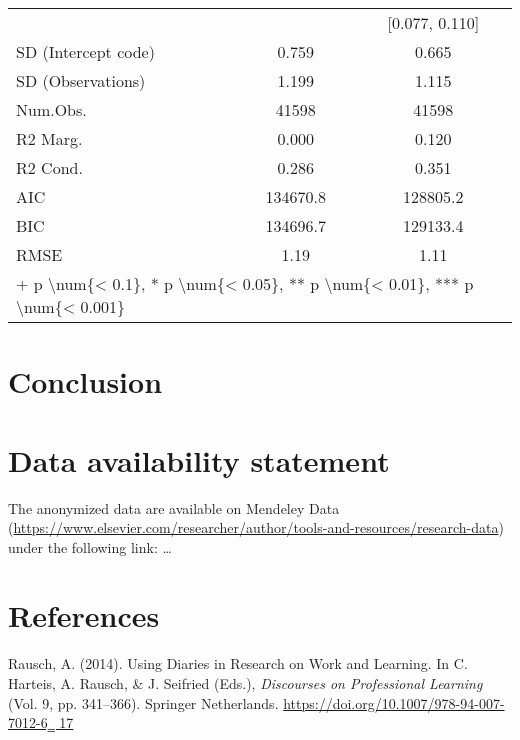 \documentclass[
]{article}
\newlength{\cslhangindent}
\newenvironment{CSLReferences}[2] %
 {\begin{list}{}{%
  \setlength{\itemindent}{0pt}
  \setlength{\leftmargin}{0pt}
  \setlength{\parsep}{0pt}
  \ifodd #1
   \setlength{\leftmargin}{\cslhangindent}
   \setlength{\itemindent}{-1\cslhangindent}
  \fi
  \setlength{\itemsep}{#2\baselineskip}}}
 {\end{list}}
\begin{document}
\begin{table}[H]
\begin{tabular}[t]{lcc}
 &  & {}[\num{0.077}, \num{0.110}]\\
SD (Intercept code) & \num{0.759} & \num{0.665}\\
SD (Observations) & \num{1.199} & \num{1.115}\\
\midrule
Num.Obs. & \num{41598} & \num{41598}\\
R2 Marg. & \num{0.000} & \num{0.120}\\
R2 Cond. & \num{0.286} & \num{0.351}\\
AIC & \num{134670.8} & \num{128805.2}\\
BIC & \num{134696.7} & \num{129133.4}\\
RMSE & \num{1.19} & \num{1.11}\\
\bottomrule
\multicolumn{3}{l}{\rule{0pt}{1em}+ p \textbackslash{}num\{< 0.1\}, * p \textbackslash{}num\{< 0.05\}, ** p \textbackslash{}num\{< 0.01\}, *** p \textbackslash{}num\{< 0.001\}}\\
\end{tabular}
\end{table}

\section{Conclusion}\label{conclusion}

\newpage

\section{Data availability statement}\label{data-availability-statement}

The anonymized data are available on Mendeley Data
(\url{https://www.elsevier.com/researcher/author/tools-and-resources/research-data})
under the following link: \ldots{}\\

\section{References}\label{references}

\label{refs}
\begin{CSLReferences}{1}{0}
Rausch, A. (2014). Using {Diaries} in {Research} on {Work} and
{Learning}. In C. Harteis, A. Rausch, \& J. Seifried (Eds.),
\emph{Discourses on {Professional Learning}} (Vol. 9, pp. 341--366).
Springer Netherlands.
\href{https://doi.org/10.1007/978-94-007-7012-6‗\%2017}{https://doi.org/10.1007/978-94-007-7012-6‗
17}

\end{CSLReferences}
\end{document}
